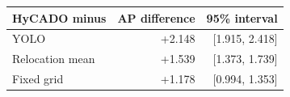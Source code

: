 \begin{tabular}{lrr}
\toprule
HyCADO minus & AP difference & 95\% interval\\
\midrule
YOLO & +2.148 & [1.915, 2.418]\\
Relocation mean & +1.539 & [1.373, 1.739]\\
Fixed grid & +1.178 & [0.994, 1.353]\\
\bottomrule
\end{tabular}
